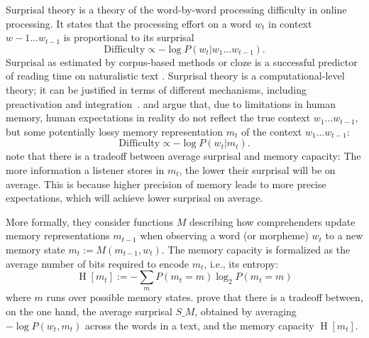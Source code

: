 \documentclass[11pt,letterpaper]{article}
\newcommand{\citep}{\parencite}
\newcommand{\citet}{\Textcite}
\newcommand\mhahn[1]{{\color{red}(#1)}}
\begin{document}
Surprisal theory \citep{hale2001probabilistic, levy2008expectation} is a theory of the word-by-word processing difficulty in online processing.
It states that the processing effort on a word $w_t$ in context $w-1 ... w_{t-1}$ is proportional to its surprisal
     \begin{equation}   \label{eq:true-surp}
    \text{Difficulty} \propto -\log P(w_t | w_1\dots w_{t-1}).
\end{equation}
Surprisal as estimated by corpus-based methods or cloze is a successful predictor of reading time on naturalistic text \citep{smith2013effect,goodkind-predictive-2018,frank2019interaction,aurnhammer2019evaluating,wilcox2020predictive}. %
Surprisal theory is a computational-level theory; it can be justified in terms of different mechanisms, including preactivation and integration~\citep{kuperberg2016we}.
\citet{futrell-noisy-context-2017-1} and \citet{Hahn2020modeling} argue that, due to limitations in human memory, human expectations in reality do not reflect the true context $w_1\dots w_{t-1}$, but some potentially lossy memory representation $m_t$ of the context $w_1\dots w_{t-1}$:
\begin{equation}   \label{eq:lossy-surp}
    \text{Difficulty} \propto -\log P(w_t | m_t).
\end{equation}
\citet{Hahn2020modeling} note that there is a tradeoff between average surprisal and memory capacity:
The more information a listener stores in $m_t$, the lower their surprisal will be on average.
This is because higher precision of memory leads to more precise expectations, which will achieve lower surprisal on average.

More formally, they consider functions $M$ describing how comprehenders update memory representations $m_{t-1}$ when observing a word (or morpheme) $w_t$ to a new memory state $m_t := M(m_{t-1}, w_t)$.
The memory capacity is formalized as the average number of bits required to encode $m_t$, i.e., its entropy:
\begin{equation*}
    \operatorname{H}[m_t] := - \sum_m P(m_t = m) \log_2 P(m_t=m)
\end{equation*}
where $m$ runs over possible memory states.
\citet{Hahn2020modeling} prove that there is a tradeoff between, on the one hand, the average surprisal $S\_M$, obtained by averaging $- \log P(w_t , m_t)$ across the words in a text, and the memory capacity $\operatorname{H}[m_t]$.

\end{document}
